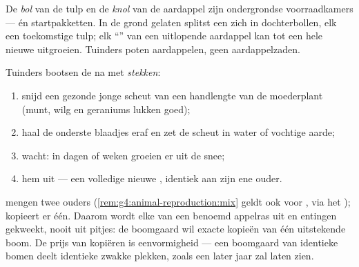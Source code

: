 \begin{example}\label{ex:g4:plants-without-seeds:bulbtuber}
De \emph{bol} van de tulp en de \emph{knol} van
de aardappel zijn ondergrondse voorraadkamers --- én startpakketten. In
de grond gelaten splitst een  zich in dochterbollen, elk een
toekomstige tulp; elk ``'' van een uitlopende aardappel kan tot een
hele nieuwe  uitgroeien. Tuinders poten aardappelen, geen
aardappelzaden.
\end{example}

\begin{method}\label{met:g4:plants-without-seeds:cutting}
Tuinders bootsen de  na met
\emph{stekken}:
\begin{enumerate}
  \item snijd een gezonde jonge scheut van een handlengte van de
        moederplant (munt, wilg en geraniums lukken goed);
  \item haal de onderste blaadjes eraf en zet de scheut in water of
        vochtige aarde;
  \item wacht: in dagen of weken groeien er  uit de snee;
  \item {} hem uit --- een volledige nieuwe , identiek aan zijn
        ene ouder.
\end{enumerate}
\end{method}

\begin{remark}\label{rem:g4:plants-without-seeds:copy}
 mengen twee ouders
(\cref{rem:g4:animal-reproduction:mix} geldt ook voor , via het
);  kopieert er één. Daarom wordt elke
 van een benoemd appelras uit  en entingen gekweekt, nooit
uit pitjes: de boomgaard wil exacte kopieën van één uitstekende boom. De
prijs van kopiëren is eenvormigheid --- een boomgaard van identieke
bomen deelt identieke zwakke plekken, zoals een later jaar zal laten zien.
\end{remark}

